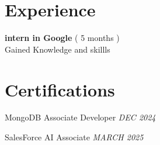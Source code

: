 \documentclass[a4paper,10pt]{article}
\begin{document}

\section*{Experience}
\noindent
\begin{compactitem}
    
    \item \textbf{ intern in Google }  ( 5 months )  \\
     Gained Knowledge and skillls
    
\end{compactitem}



\section*{Certifications}
\noindent
\begin{compactitem}
    
        \item MongoDB Associate Developer \hfill \textit{ DEC 2024 }
    
        \item SalesForce AI Associate \hfill \textit{ MARCH 2025 }
    
\end{compactitem}
\end{document}
